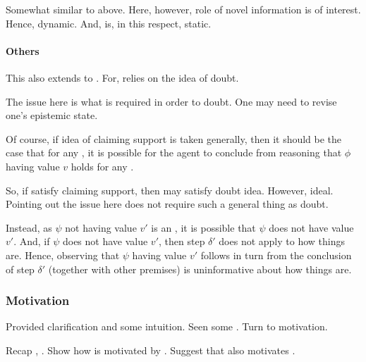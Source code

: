 \begin{note}[Issue]
  Somewhat similar to above.
  Here, however, role of novel information is of interest.
  Hence, dynamic.
  And, \csN{} is, in this respect, static.
\end{note}


\paragraph{Others}

\begin{note}
  This also extends to \citeauthor{Wright:2011wn}.
  For, \citeauthor{Wright:2011wn} relies on the idea of doubt.

  The issue here is what is required in order to doubt.
  One may need to revise one's epistemic state.

  Of course, if idea of claiming support is taken generally, then it should be the case that for any \epPW{}, it is possible for the agent to conclude from reasoning that \(\phi\) having value \(v\) holds for any \epVAd{} \world{}.

  So, if satisfy claiming support, then may satisfy doubt idea.
  However, ideal.
  Pointing out the issue here does not require such a general thing as doubt.
\end{note}

\begin{note}
  Instead, as \(\psi\) not having value \(v'\) is an \ep{}, it is possible that \(\psi\) does not have value \(v'\).
  And, if \(\psi\) does not have value \(v'\), then step \(\delta'\) does not apply to how things are.
  Hence, observing that \(\psi\) having value \(v'\) follows in turn from the conclusion of step \(\delta'\) (together with other premises) is uninformative about how things are.
\end{note}

\subsubsection{Motivation}
\label{sec:motivation}

\begin{note}
  Provided clarification and some intuition.
  Seen some .
  Turn to motivation.

  Recap \ideaS{}, \support{}.
  Show how \ideaCS{} is motivated by \ideaS{}.
  Suggest that \ideaCS{} also motivates \ideaS{}.
\end{note}

